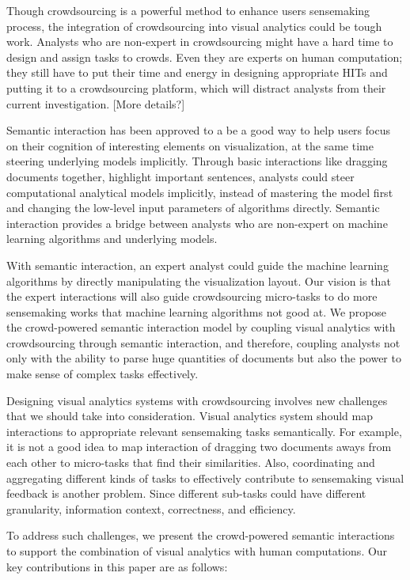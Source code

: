 \documentclass[journal]{vgtc}                %
\begin{document}
Though crowdsourcing is a powerful method to enhance users sensemaking process, the integration of crowdsourcing into visual analytics could be tough work. Analysts who are non-expert in crowdsourcing might have a hard time to design and assign tasks to crowds. Even they are experts on human computation; they still have to put their time and energy in designing appropriate HITs and putting it to a crowdsourcing platform, which will distract analysts from their current investigation. [More details?]

Semantic interaction\cite{Endert2014} has been approved to a be a good way to help users focus on their cognition of interesting elements on visualization, at the same time steering underlying models implicitly\cite{Endert2012}. Through basic interactions like dragging documents together, highlight important sentences, analysts could steer computational analytical models implicitly, instead of mastering the model first and changing the low-level input parameters of algorithms directly. Semantic interaction provides a bridge between analysts who are non-expert on machine learning algorithms and underlying models.

With semantic interaction, an expert analyst could guide the machine learning algorithms by directly manipulating the visualization layout. Our vision is that the expert interactions will also guide crowdsourcing micro-tasks to do more sensemaking works that machine learning algorithms not good at. We propose the crowd-powered semantic interaction model by coupling visual analytics with crowdsourcing through semantic interaction, and therefore, coupling analysts not only with the ability to parse huge quantities of documents but also the power to make sense of complex tasks effectively.

Designing visual analytics systems with crowdsourcing involves new challenges that we should take into consideration. Visual analytics system should map interactions to appropriate relevant sensemaking tasks semantically. For example, it is not a good idea to map interaction of dragging two documents aways from each other to micro-tasks that find their similarities. Also, coordinating and aggregating different kinds of tasks to effectively contribute to sensemaking visual feedback is another problem. Since different sub-tasks could have different granularity, information context, correctness, and efficiency.

To address such challenges, we present the crowd-powered semantic interactions to support the combination of visual analytics with human computations. Our key contributions in this paper are as follows:
\end{document}
